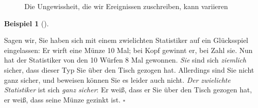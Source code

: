 \documentclass[
  letterpaper,
  twoside,
  open=any]{scrbook}
\theoremstyle{definition}
\theoremstyle{definition}
\theoremstyle{definition}
\newtheorem{example}{Beispiel}[chapter]
\theoremstyle{remark}
\begin{document}
\begin{figure}

\begin{minipage}{0.50\linewidth}



\end{minipage}%
%
\begin{minipage}{0.50\linewidth}



\end{minipage}%

\caption{\label{fig-ungewiss-anna-berta}Die Ungewissheit, die wir
Ereignissen zuschreiben, kann variieren}

\end{figure}%

\begin{example}[]\protect\hypertarget{exm-ungewiss2}{}\label{exm-ungewiss2}

Sagen wir, Sie haben sich mit einem zwielichten Statistiker auf ein
Glücksspiel eingelassen: Er wirft eine Münze 10 Mal; bei Kopf gewinnt
er, bei Zahl sie. Nun hat der Statistiker von den 10 Würfen 8 Mal
gewonnen. \emph{Sie} sind sich \emph{ziemlich} sicher, dass dieser Typ
Sie über den Tisch gezogen hat. Allerdings sind Sie nicht ganz sicher,
und beweisen können Sie es leider auch nicht. \emph{Der zwielichte
Statistiker} ist sich \emph{ganz sicher}: Er weiß, dass er Sie über den
Tisch gezogen hat, er weiß, dass seine Münze gezinkt ist. \(\square\)

\end{example}
\end{document}
